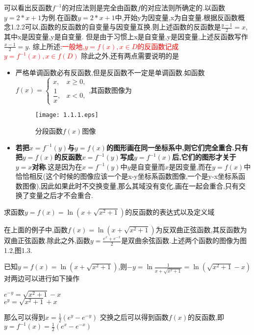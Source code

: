 \documentclass[12pt, a4paper, oneside, UTF8]{ctexbook}  %
\begin{document}
可以看出反函数$f^{-1}$的对应法则是完全由函数$f$的对应法则所确定的.以函数$y=2*x+1$为例.在函数$y=2*x+1$中,开始y为因变量,x为自变量.根据反函数概念1.2.2可以,函数的反函数的自变量与因变量互换.则上述函数的反函数是$\frac{y-1}{2}=x$,其中x是因变量,y是自变量.
但是由于习惯上x是自变量,y是因变量,上述反函数写作$\frac{x-1}{2}=y$.
综上所述:\textcolor{red}{一般地,$y=f(x),x \in D$的反函数记成$y=f^{-1}\left(x\right),x\in f(D)$}
除此之外,还有两点需要说明的是
\begin{itemize}
    \item 严格单调函数必有反函数,但是反函数不一定是单调函数.如函数$f(x)=\begin{cases}x,&x\geqslant0,\\\dfrac{1}{x},&x<0,\end{cases}$,其函数图像为\begin{figure}[H]
              \centering \texttt{[image: 1.1.1.eps]} \caption{分段函数$f(x)$图像}
              \label{xxx1} \end{figure}
    \item \textbf{若把$x=f^{-1}(y)$与$y=f(x)$的图形画在同一坐标系中,则它们完全重合.只有把$y=f(x)$的反函数$x=f^{-1}(y)$写成$y=f^{-1}(x)$后,它们的图形才关于 $y=x$对称}.这是因为在$x=f^{-1}(y)$中$y$是自变量而$x$是因变量,而在$y=f(x)$中恰恰相反(这个时候的图像应该一个是x-y坐标系函数图像,一个是y-x坐标系函数图像),因此如果此时不交换变量,那么其域没有变化,画在一起会重合,只有交换了变量之后才不会重合.
\end{itemize}
\begin{problem}
求函数$y=f(x)=\ln(x+\sqrt{x^2+1})$的反函数的表达式以及定义域
\end{problem}
\begin{note}
    在上面的例子中,函数$f(x)=\ln(x+\sqrt{x^2+1})$为反双曲正弦函数,其反函数为双曲正弦函数.除此之外,函数$y=\frac{e^x+e^{-x}}{2}$是双曲余弦函数.上述两个函数的图像为图1.2,图1.3.
\end{note}
\begin{solution}
    已知$y=f(x)=\ln(x+\sqrt{x^2+1})$,则$-y=\ln \frac{1}{x+\sqrt{x^2+1}}=\ln(\sqrt{x^2+1}-x)$\\
    对两边可以进行如下操作
    \begin{center}
        $e^{-y}=\sqrt{x^2+1}-x$\\
        $e^{y}=\sqrt{x^2+1}+x$\\
    \end{center}
    那么可以得到$x=\frac{1}{2}(e^y-e^{-y})$
    交换之后可以得到函数$f(x)$的反函数,即
    $y=f^{-1}(x)=\frac{1}{2}(e^x-e^{-x})$
\end{solution}
\end{document}
